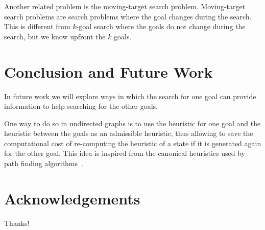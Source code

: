 \documentclass{aicom2e}
\newcommand{\kgs}{$k$-goal search}
\begin{document}
Another related problem is the moving-target search problem. Moving-target
search problems are search problems where the goal changes during the search.
This is different from \kgs{} where the goals do not change during the search,
but we know upfront the $k$ goals.

\section{Conclusion and Future Work}




In future work we will explore ways in which the search for one goal can
provide information to help searching for the other goals.


One way to do so in undirected graphs is to use the heuristic for one goal and
the heuristic between the goals as an admissible heuristic, thus allowing to
save the computational cost of re-computing the heuristic of a state if it is
generated again for the other goal. This idea is inspired from the canonical
heuristics used by path finding algorithms~\cite{canonical}.




\section*{Acknowledgements}
Thanks!



\end{document}
